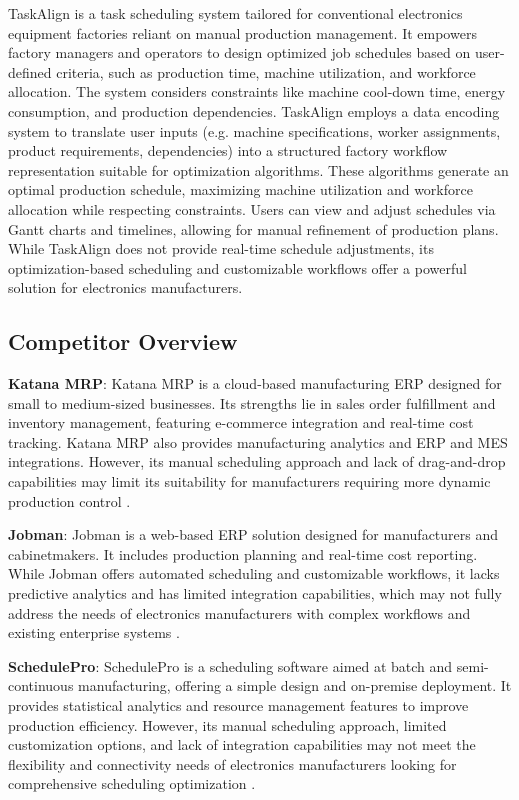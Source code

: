 TaskAlign is a task scheduling system tailored for conventional electronics equipment factories reliant on manual production management. It empowers factory managers and operators to design optimized job schedules based on user-defined criteria, such as production time, machine utilization, and workforce allocation. The system considers constraints like machine cool-down time, energy consumption, and production dependencies. TaskAlign employs a data encoding system to translate user inputs (e.g. machine specifications, worker assignments, product requirements, dependencies) into a structured factory workflow representation suitable for optimization algorithms. These algorithms generate an optimal production schedule, maximizing machine utilization and workforce allocation while respecting constraints. Users can view and adjust schedules via Gantt charts and timelines, allowing for manual refinement of production plans. While TaskAlign does not provide real-time schedule adjustments, its optimization-based scheduling and customizable workflows offer a powerful solution for electronics manufacturers.

\subsection{Competitor Overview}

\textbf{Katana MRP}: Katana MRP is a cloud-based manufacturing ERP designed for small to medium-sized businesses. Its strengths lie in sales order fulfillment and inventory management, featuring e-commerce integration and real-time cost tracking. Katana MRP also provides manufacturing analytics and ERP and MES integrations. However, its manual scheduling approach and lack of drag-and-drop capabilities may limit its suitability for manufacturers requiring more dynamic production control \cite{katana_mrp}.

\textbf{Jobman}: Jobman is a web-based ERP solution designed for manufacturers and cabinetmakers. It includes production planning and real-time cost reporting. While Jobman offers automated scheduling and customizable workflows, it lacks predictive analytics and has limited integration capabilities, which may not fully address the needs of electronics manufacturers with complex workflows and existing enterprise systems \cite{jobman_erp}.

\textbf{SchedulePro}: SchedulePro is a scheduling software aimed at batch and semi-continuous manufacturing, offering a simple design and on-premise deployment. It provides statistical analytics and resource management features to improve production efficiency. However, its manual scheduling approach, limited customization options, and lack of integration capabilities may not meet the flexibility and connectivity needs of electronics manufacturers looking for comprehensive scheduling optimization \cite{schedulepro}.

